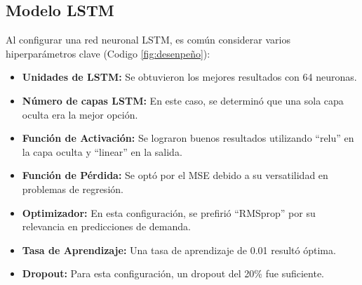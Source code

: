 
\subsection{Modelo LSTM}


Al configurar una red neuronal LSTM, es común considerar varios hiperparámetros
clave (Codigo \ref{fig:desenpeño}):

\begin{itemize}
  \item  \textbf{Unidades de LSTM:} Se obtuvieron los mejores resultados con 64 neuronas.
   
  
  \item \textbf{Número de capas LSTM:} En este caso, se determinó que una sola capa oculta era la mejor opción.

 
  \item \textbf{Función de Activación:} Se lograron buenos resultados utilizando “relu” en la capa oculta y “linear” en la salida.

 
  \item \textbf{Función de Pérdida:} Se optó por el MSE debido a su versatilidad en problemas de regresión.

 
  \item \textbf{Optimizador:} En esta configuración, se prefirió “RMSprop” por su relevancia en predicciones de demanda.

 
  \item \textbf{Tasa de Aprendizaje:} Una tasa de aprendizaje de 0.01 resultó óptima.

 
  \item \textbf{Dropout:} Para esta configuración, un dropout del 20\% fue suficiente.
\end{itemize}

